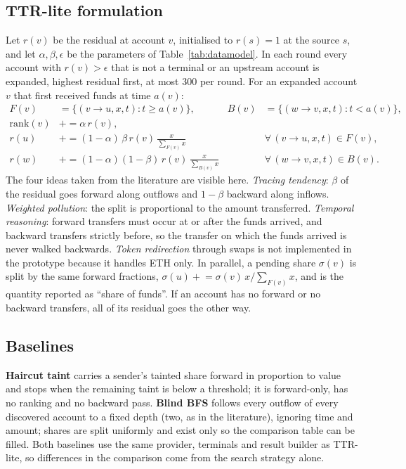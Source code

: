 \subsection{TTR-lite formulation}
Let $r(v)$ be the residual at account $v$, initialised to $r(s)=1$ at the source $s$, and let $\alpha,\beta,\epsilon$ be the parameters of Table~\ref{tab:datamodel}. In each round every account with $r(v)>\epsilon$ that is not a terminal or an upstream account is expanded, highest residual first, at most 300 per round. For an expanded account $v$ that first received funds at time $a(v)$:
\begin{align}
F(v)&=\{(v\to u,x,t):t\ge a(v)\}, & B(v)&=\{(w\to v,x,t):t<a(v)\},\\
\mathrm{rank}(v) &\mathrel{+}= \alpha\, r(v),\\
r(u) &\mathrel{+}= (1-\alpha)\,\beta\, r(v)\,\frac{x}{\sum_{F(v)}x} && \forall\,(v\to u,x,t)\in F(v),\\
r(w) &\mathrel{+}= (1-\alpha)(1-\beta)\, r(v)\,\frac{x}{\sum_{B(v)}x} && \forall\,(w\to v,x,t)\in B(v).
\end{align}
The four ideas taken from the literature are visible here. \emph{Tracing tendency}: $\beta$ of the residual goes forward along outflows and $1-\beta$ backward along inflows. \emph{Weighted pollution}: the split is proportional to the amount transferred. \emph{Temporal reasoning}: forward transfers must occur at or after the funds arrived, and backward transfers strictly before, so the transfer on which the funds arrived is never walked backwards. \emph{Token redirection} through swaps is not implemented in the prototype because it handles ETH only. In parallel, a pending share $\sigma(v)$ is split by the same forward fractions, $\sigma(u)\mathrel{+}=\sigma(v)\,x/\sum_{F(v)}x$, and is the quantity reported as ``share of funds''. If an account has no forward or no backward transfers, all of its residual goes the other way.

\subsection{Baselines}
\textbf{Haircut taint} carries a sender's tainted share forward in proportion to value and stops when the remaining taint is below a threshold; it is forward-only, has no ranking and no backward pass. \textbf{Blind BFS} follows every outflow of every discovered account to a fixed depth (two, as in the literature), ignoring time and amount; shares are split uniformly and exist only so the comparison table can be filled. Both baselines use the same provider, terminals and result builder as TTR-lite, so differences in the comparison come from the search strategy alone.

